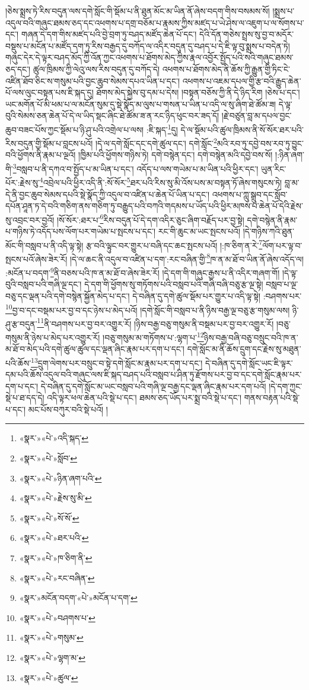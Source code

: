 །ཅེས་སྨྲས་ཏེ་རིས་བདུན་ལས་དགེ་སློང་གི་སྡོམ་པ་ནི་ཐུན་མོང་མ་ཡིན་ནོ་ཞེས་བདག་གིས་བསམས་སོ། །སྨྲས་པ་འདུལ་བའི་གཞུང་ཐམས་ཅད་དང་འཕགས་པ་དགྲ་བཅོམ་པ་རྣམས་ཀྱིས་མཛད་པ་ཡེ་ཤེས་ལ་འཇུག་པ་ལ་སོགས་པ་དང་། གཞན་དེ་དག་གིས་མཛད་པའི་བྱེ་བྲག་ཏུ་བཤད་མཛོད་ཆེན་པོ་དང་། དེའི་དོན་གཅེས་སྤྲས་སུ་བྱ་བ་མདོར་བསྡུས་པ་མངོན་པ་མཛོད་དག་ཏུ་རིས་བརྒྱད་དུ་བཀོད་ལ་འདིར་བདུན་དུ་བཤད་པ་དེ་ཇི་ལྟ་བུ་སྨྲས་པ་བདེན་ཏེ། གཞུང་དེར་དེ་ལྟར་བཤད་མོད་ཀྱི་འོན་ཀྱང་འཕགས་པ་ཐོགས་མེད་ཀྱིས་རྣལ་འབྱོར་སྤྱོད་པའི་སའི་གཞུང་ཐམས་ཅད་དང་། ཚུལ་ཁྲིམས་ཀྱི་ལེའུ་ལས་རིས་བདུན་དུ་བཀོད་དེ། འཕགས་པ་ཐོགས་མེད་ནི་ཆོས་ཀྱི་རྒྱུན་གྱི་ཏིང་ངེ་འཛིན་ཐོབ་ཅིང་ས་གསུམ་པའི་བྱང་ཆུབ་སེམས་དཔའ་ཡིན་པ་དང་། འཕགས་པ་འཇམ་དཔལ་གྱི་རྩ་བའི་རྒྱུད་ཆེན་པོ་ལས་ལུང་བསྟན་པས་ཇི་སྐད་དུ། ཐོགས་མེད་སྐྱེས་བུ་དམ་པ་དེས། །བསྟན་བཅོས་ཀྱི་ནི་དེ་ཉིད་རིག །ཅེས་པ་དང་། ཡང་མགོན་པོ་མི་ཕམ་པ་ལ་མངོན་སུམ་དུ་སྡེ་སྣོད་མ་ལུས་པ་གསན་པ་ཡིན་པ་འདི་ལ་སུ་ཞིག་ཐེ་ཚོམ་ཟ། དེ་ལྟ་བུའི་སེམས་ཅན་ཆེན་པོ་དེ་ལ་ཡིད་སྡང་ཞིང་ཐེ་ཚོམ་ཟ་ན་རང་ཉིད་ཕུང་བར་ཟད་དོ། །རྗེ་བཙུན་བླ་མ་དཔལ་བྱང་ཆུབ་བཟང་པོས་ཀྱང་སྡོམ་པ་ཉི་ཤུ་པའི་འགྲེལ་པ་ལས། :ཇི་སྐད་\footnote{«སྣར་»«པེ་»འདི་སྐད་}དུ། དེ་ལ་སྡོམ་པའི་ཚུལ་ཁྲིམས་ནི་སོ་སོར་ཐར་པའི་རིས་བདུན་གྱི་སྡོམ་པ་བླངས་པའོ། །དེ་ལ་དགེ་སློང་དང་དགེ་ཚུལ་དང་། དགེ་སློང་\footnote{«སྣར་»«པེ་»སློབ་}མའི་རབ་ཏུ་དབྱེ་བས་རབ་ཏུ་བྱུང་བའི་ཕྱོགས་ནི་རྣམ་པ་ལྔའོ། །ཁྱིམ་པའི་ཕྱོགས་གཉིས་ཏེ། དགེ་བསྙེན་དང་། དགེ་བསྙེན་མའི་དབྱེ་བས་སོ། །:ཉིན་ཞག་གི་\footnote{«སྣར་»«པེ་»ཉིན་ཞག་པའི་}བསླབ་པ་ནི་དཀའ་བ་སྤྱོད་པ་མ་ཡིན་པ་དང་། འདོད་པ་ལས་གཡེམ་པ་མ་ཡིན་པའི་ཕྱིར་དང་། ཡུན་རིང་པོར་:རྗེས་སུ་\footnote{«སྣར་»«པེ་»རྗེས་སུ་མི་}འབྲེལ་པའི་ཕྱིར་འདི་ནི་:སོ་སོར་\footnote{«སྣར་»«པེ་»སོ་སོ་}ཐར་པའི་རིས་སུ་མི་འོས་པས་མ་བསྟན་ཏོ་ཞེས་གསུངས་ཏེ། བླ་མ་དེ་ནི་བྱང་ཆུབ་སེམས་དཔའི་སྡེ་སྣོད་ཀྱི་འདུལ་བ་འཛིན་པ་ཆེན་པོ་ཡིན་པ་དང་། འཕགས་པ་ཀླུ་སྒྲུབ་དང་སློབ་དཔོན་ཤཱན་ཏ་དེ་བའི་གཅིག་ནས་གཅིག་ཏུ་བརྒྱུད་པའི་བཀའི་གདམས་པ་ཡོད་པའི་ཕྱིར་མཁས་པ་ཆེན་པོ་དེའི་རྗེས་སུ་འབྲང་བར་བྱའོ། །སོ་སོར་:ཐར་པ་\footnote{«སྣར་»«པེ་»ཐར་པའི་}རིས་བདུན་པོ་དེ་དག་འདིར་ཅུང་ཞིག་བརྗོད་པར་བྱ་སྟེ། དགེ་བསྙེན་ནི་རྣམ་པ་གཉིས་ཏེ་འདོད་པས་ལོག་པར་གཡེམ་པ་སྤངས་པ་དང་། རང་གི་ཆུང་མ་ཡང་སྤངས་པའོ། །དེ་གཉིས་ཀའི་ཐུན་མོང་གི་བསླབ་པ་ནི་འདི་ལྟ་སྟེ། རྩ་བའི་ལྟུང་བར་གྱུར་པ་བཞི་དང་ཆང་སྤངས་པའོ། །:ཁ་ཅིག་ན་རེ་\footnote{«སྣར་»«པེ་»ཁ་ཅིག་ནི་}ལོག་པར་ལྟ་བ་སྤངས་པའོ་ཞེས་ཟེར་རོ། །དེ་ལ་ཆང་ནི་འདུལ་བ་འཛིན་པ་དག་:རང་བཞིན་གྱི་\footnote{«སྣར་»«པེ་»རང་བཞིན་}ཁ་ན་མ་ཐོ་བ་ཡིན་ནོ་ཞེས་འདོད་ལ། :མངོན་པ་བདག་\footnote{«སྣར་»མངོན་བདག་«པེ་»མངོན་པ་དག་}ནི་བཅས་པའི་ཁ་ན་མ་ཐོ་བ་ཞེས་ཟེར་རོ། །དེ་དག་གི་གཞུང་རྒྱས་པ་ནི་འདིར་གཞག་གོ། །དེ་ལྟ་བུའི་བསླབ་པའི་གཞི་ལྔ་དང་། དེ་དག་གི་ཕྱོགས་སུ་གཏོགས་པའི་བསླབ་པའི་གཞི་བཞི་བཅུ་རྩ་ལྔ་སྟེ། བསླབ་པ་ལྔ་བཅུ་དང་ལྡན་པའི་དགེ་བསྙེན་སྐྱོན་མེད་པ་དང་། དེ་བཞིན་དུ་དགེ་ཚུལ་སྡོམ་པར་གྱུར་པ་འདི་ལྟ་སྟེ། :བཤགས་པར་\footnote{«སྣར་»«པེ་»བཤགས་པ་}བྱ་བ་དང་བསྡམ་པར་བྱ་བ་དང་ཉེས་པ་མེད་པའོ། །དགེ་སློང་གི་བསླབ་པ་ནི་ཉིས་བརྒྱ་ལྔ་བཅུ་རྩ་གསུམ་ལས། ཉི་ཤུ་རྩ་བདུན་\footnote{«སྣར་»«པེ་»གསུམ་}ནི་བཤགས་པར་བྱ་བར་འགྱུར་རོ། །ཉིས་བརྒྱ་བཅུ་གསུམ་ནི་བསྡམ་པར་བྱ་བར་འགྱུར་རོ། །བཅུ་གསུམ་ནི་ཉེས་པ་མེད་པར་འགྱུར་རོ། །བཅུ་གསུམ་མ་གཏོགས་པ་:ལྷག་པ་\footnote{«སྣར་»«པེ་»ལྷག་མ་}ཉིས་བརྒྱ་བཞི་བཅུ་བསྲུང་བའི་ཁ་ན་མ་ཐོ་བ་མེད་པའི་དགེ་ཚུལ་ཚུལ་དང་ལྡན་ཞིང་རྣམ་པར་དག་པ་དང་། དགེ་སློང་མ་ནི་ཆོས་དྲུག་དང་རྗེས་སུ་མཐུན་པའི་ཆོས་\footnote{«སྣར་»«པེ་»ཚུལ་}དྲུག་ལེགས་པར་བསྲུང་བ་སྟེ་དགེ་སློང་མ་རྣམ་པར་དག་པ་དང་། དེ་བཞིན་དུ་དགེ་སློང་ཡང་ཇི་ལྟར་དམ་པའི་ཆོས་འདུལ་བའི་གཞུང་ལས་ཇི་སྐད་བཤད་པའི་བསླབ་པ་ཤིན་ཏུ་རྫོགས་པར་བྱ་བ་དང་དགེ་སློང་རྣམ་པར་དག་པ་དང་། དེ་བཞིན་དུ་དགེ་སློང་མ་ཡང་བསླབ་པའི་གཞི་ལྔ་བརྒྱ་དང་ལྡན་ཞིང་རྣམ་པར་དག་པའོ། །དེ་དག་ཀྱང་སྡེ་པ་ཐ་དད་དེ། འདི་ལྟར་ཕལ་ཆེན་པའི་སྡེ་པ་དང་། ཐམས་ཅད་ཡོད་པར་སྨྲ་བའི་སྡེ་པ་དང་། གནས་བརྟན་པའི་སྡེ་པ་དང་། མང་པོས་བཀུར་བའི་སྡེ་པའོ། །
